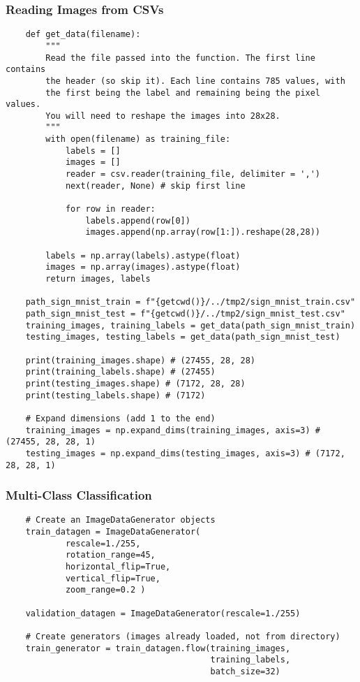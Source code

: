 \documentclass[11pt, a4paper]{article}
\begin{document}
\begin{spacing}{1.1}
	\subsubsection{Reading Images from CSVs}
	\begin{lstlisting}
	def get_data(filename):
		"""
		Read the file passed into the function. The first line contains
		the header (so skip it). Each line contains 785 values, with
		the first being the label and remaining being the pixel values.
		You will need to reshape the images into 28x28.
		"""
		with open(filename) as training_file:
			labels = [] 
			images = []
			reader = csv.reader(training_file, delimiter = ',')
			next(reader, None) # skip first line
			
			for row in reader:
				labels.append(row[0])
				images.append(np.array(row[1:]).reshape(28,28))
			
		labels = np.array(labels).astype(float)
		images = np.array(images).astype(float)
		return images, labels
	
	path_sign_mnist_train = f"{getcwd()}/../tmp2/sign_mnist_train.csv"
	path_sign_mnist_test = f"{getcwd()}/../tmp2/sign_mnist_test.csv"
	training_images, training_labels = get_data(path_sign_mnist_train)
	testing_images, testing_labels = get_data(path_sign_mnist_test)
	
	print(training_images.shape) # (27455, 28, 28)
	print(training_labels.shape) # (27455)
	print(testing_images.shape) # (7172, 28, 28)
	print(testing_labels.shape) # (7172)
	
	# Expand dimensions (add 1 to the end)
	training_images = np.expand_dims(training_images, axis=3) #	(27455, 28, 28, 1)
	testing_images = np.expand_dims(testing_images, axis=3) # (7172, 28, 28, 1)	\end{lstlisting} \newpage

	\subsubsection{Multi-Class Classification}
	\begin{lstlisting}
	# Create an ImageDataGenerator objects
	train_datagen = ImageDataGenerator(
			rescale=1./255,
			rotation_range=45,
			horizontal_flip=True,
			vertical_flip=True,
			zoom_range=0.2 )
	
	validation_datagen = ImageDataGenerator(rescale=1./255)
	
	# Create generators (images already loaded, not from directory)
	train_generator = train_datagen.flow(training_images,
	                                     training_labels,
	                                     batch_size=32)
	

\end{lstlisting}
\end{spacing}
\end{document}

